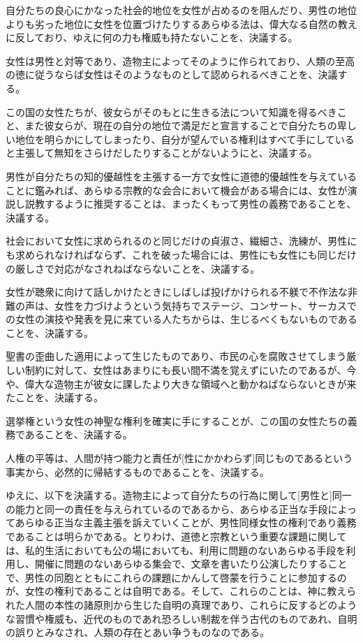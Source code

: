 \documentclass[dvipdfmx,uplatex]{jsarticle}
\begin{document}
自分たちの良心にかなった社会的地位を女性が占めるのを阻んだり、男性の地位よりも劣った地位に女性を位置づけたりするあらゆる法は、偉大なる自然の教えに反しており、ゆえに何の力も権威も持たないことを、決議する。

女性は男性と対等であり、造物主によってそのように作られており、人類の至高の徳に従うならば女性はそのようなものとして認められるべきことを、決議する。

この国の女性たちが、彼女らがそのもとに生きる法について知識を得るべきこと、また彼女らが、現在の自分の地位で満足だと宣言することで自分たちの卑しい地位を明らかにしてしまったり、自分が望んでいる権利はすべて手にしていると主張して無知をさらけだしたりすることがないようにと、決議する。

男性が自分たちの知的優越性を主張する一方で女性に道徳的優越性を与えていることに鑑みれば、あらゆる宗教的な会合において機会がある場合には、女性が演説し説教するように推奨することは、まったくもって男性の義務であることを、決議する。

社会において女性に求められるのと同じだけの貞淑さ、繊細さ、洗練が、男性にも求められなければならず、これを破った場合には、男性にも女性にも同じだけの厳しさで対応がなされねばならないことを、決議する。

女性が聴衆に向けて話しかけたときにしばしば投げかけられる不躾で不作法な非難の声は、女性を力づけようという気持ちでステージ、コンサート、サーカスでの女性の演技や発表を見に来ている人たちからは、生じるべくもないものであることを、決議する。

聖書の歪曲した適用によって生じたものであり、市民の心を腐敗させてしまう厳しい制約に対して、女性はあまりにも長い間不満を覚えずにいたのであるが、今や、偉大な造物主が彼女に課したより大きな領域へと動かねばならないときが来たことを、決議する。

選挙権という女性の神聖な権利を確実に手にすることが、この国の女性たちの義務であることを、決議する。

  人権の平等は、人間が持つ能力と責任が[性にかかわらず]同じものであるという事実から、必然的に帰結するものであることを、決議する。

  ゆえに、以下を決議する。造物主によって自分たちの行為に関して[男性と]同一の能力と同一の責任を与えられているのであるから、あらゆる正当な手段によってあらゆる正当な主義主張を訴えていくことが、男性同様女性の権利であり義務であることは明らかである。とりわけ、道徳と宗教という重要な課題に関しては、私的生活においても公の場においても、利用に問題のないあらゆる手段を利用し、開催に問題のないあらゆる集会で、文章を書いたり公演したりすることで、男性の同胞とともにこれらの課題にかんして啓蒙を行うことに参加するのが、女性の権利であることは自明である。そして、これらのことは、神に教えられた人間の本性の諸原則から生じた自明の真理であり、これらに反するどのような習慣や権威も、近代のものであれ恐ろしい制裁を伴う古代のものであれ、自明の誤りとみなされ、人類の存在とあい争うものなのである。
\end{document}
